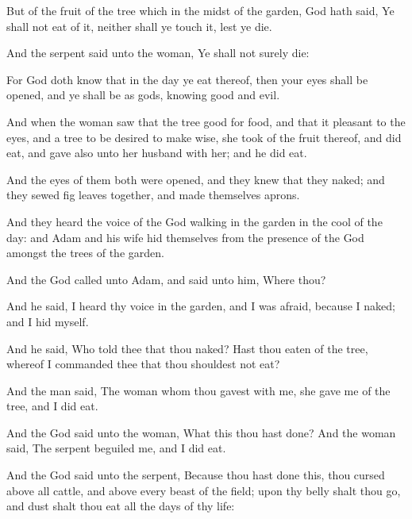 {But of the
fruit of the
tree which
{} in the
midst of the
garden,
God hath
said, Ye shall not
eat of it, neither shall ye
touch it,
lest ye
die.

And the
serpent
said unto the
woman, Ye shall not
surely
die:

For
God doth
know that in the
day ye
eat thereof, then your
eyes shall be
opened, and ye shall be as
gods,
knowing
good and
evil.


\par }{\PP {}And when the
woman
saw that the
tree
{}
good for
food, and that
it
{}
pleasant to the
eyes, and a
tree to be
desired to make
{}
wise, she
took of the fruit
thereof, and did
eat, and
gave
also unto her
husband with her; and he did
eat.

And the
eyes of them
both were
opened, and
they
knew that they
{}
naked; and they
sewed
fig
leaves
together, and made
themselves
aprons.

And they
heard the
voice of the
{}
God
walking in the
garden in the
cool of the
day: and
Adam and his
wife hid
themselves from the
presence of the
{}
God
amongst the
trees of the
garden.


\par }{\PP {}And the
{}
God
called unto
Adam, and
said unto him, Where
{}
thou?

And he
said, I
heard thy
voice in the
garden, and I was
afraid, because
I
{}
naked; and I hid
myself.


\par }{\PP {}And he
said,
Who
told thee that thou
{}
naked? Hast thou
eaten of the
tree, whereof I commanded
thee that thou shouldest
not
eat?

And the
man
said, The
woman whom thou
gavest
{} with
me,
she
gave me of the
tree, and I did
eat.

And the
{}
God
said unto the
woman, What
{} this
{} thou hast
done? And the
woman
said, The
serpent beguiled
me, and I did
eat.


\par }{\PP {}And the
{}
God
said unto the
serpent, Because
thou hast
done this, thou
{}
cursed above all
cattle, and above every
beast of the
field; upon thy
belly shalt thou
go, and
dust shalt thou
eat all the
days of thy
life:

}
